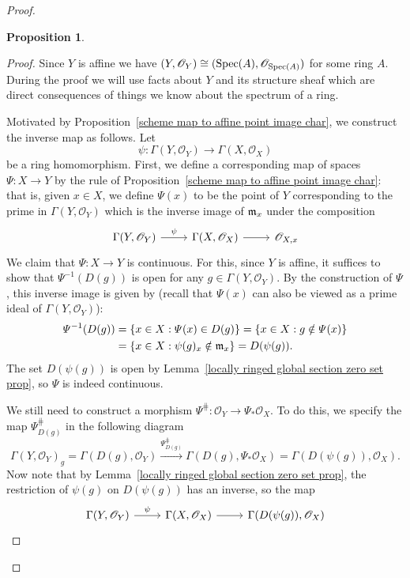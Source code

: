 \documentclass[11pt]{book}
\newtheorem{proposition}[theorem]{Proposition}
\theoremstyle{definition}
\begin{document}
\begin{proof}
\begin{proposition}
\end{proposition}
\begin{proof}
Since $Y$ is affine we have $(Y,\mathscr{O}_Y)\cong(\mathrm{Spec}(A),\mathscr{O}_{\mathrm{Spec}(A)})$ for some ring $A$. During the proof we will use facts about $Y$ and its structure sheaf which are direct consequences of things we know about the spectrum of a ring.\par
Motivated by Proposition~\ref{scheme map to affine point image char}, we construct the inverse map as follows. Let
\[\psi:\Gamma(Y,\mathscr{O}_Y)\to\Gamma(X,\mathscr{O}_X)\]
be a ring homomorphism. First, we define a corresponding map of spaces $\varPsi:X\to Y$ by the rule of Proposition~\ref{scheme map to affine point image char}: that is, given $x\in X$, we define $\varPsi(x)$ to be the point of $Y$ corresponding to the prime in $\Gamma(Y,\mathscr{O}_Y)$ which is the inverse image of $\mathfrak{m}_x$ under the composition
\[\begin{tikzcd}
\Gamma(Y,\mathscr{O}_Y)\ar[r,"\psi"]&\Gamma(X,\mathscr{O}_X)\ar[r]&\mathscr{O}_{X,x}
\end{tikzcd}\]
We claim that $\varPsi:X\to Y$ is continuous. For this, since $Y$ is affine, it suffices to show that $\varPsi^{-1}(D(g))$ is open for any $g\in\Gamma(Y,\mathscr{O}_Y)$. By the construction of $\varPsi$, this inverse image is given by (recall that $\varPsi(x)$ can also be viewed as a prime ideal of $\Gamma(Y,\mathscr{O}_Y)$):
\begin{align*}
\varPsi^{-1}(D(g))&=\{x\in X:\varPsi(x)\in D(g)\}=\{x\in X:g\notin\varPsi(x)\}\\
&=\{x\in X:\psi(g)_x\notin\mathfrak{m}_{x}\}=D(\psi(g)).
\end{align*}
The set $D(\psi(g))$ is open by Lemma~\ref{locally ringed global section zero set prop}, so $\varPsi$ is indeed continuous.\par
We still need to construct a morphism $\varPsi^{\hash}:\mathscr{O}_Y\to\varPsi_*\mathscr{O}_X$. To do this, we specify the map $\varPsi^{\hash}_{D(g)}$ in the following diagram
\[\Gamma(Y,\mathscr{O}_Y)_g=\Gamma(D(g),\mathscr{O}_Y)\stackrel{\varPsi^{\hash}_{D(g)}}{\longrightarrow}\Gamma(D(g),\varPsi_*\mathscr{O}_X)=\Gamma(D(\psi(g)),\mathscr{O}_X).\]
Now note that by Lemma~\ref{locally ringed global section zero set prop}, the restriction of $\psi(g)$ on $D(\psi(g))$ has an inverse, so the map
\[\begin{tikzcd}
\Gamma(Y,\mathscr{O}_Y)\ar[r,"\psi"]&\Gamma(X,\mathscr{O}_X)\ar[r]&\Gamma(D(\psi(g)),\mathscr{O}_X)
\end{tikzcd}
\]
\end{proof}
\end{proof}
\end{document}
